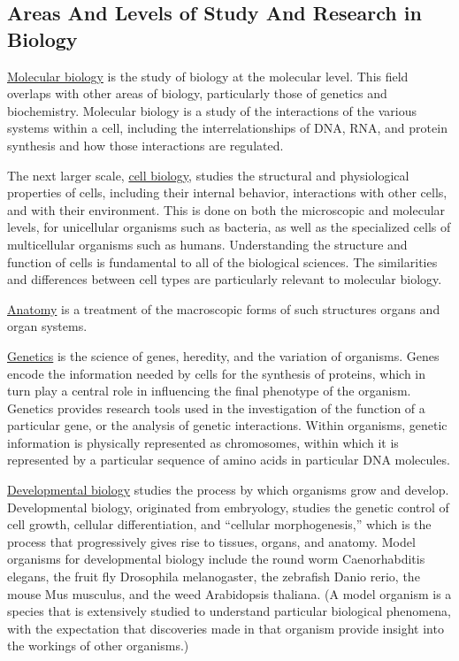 \documentclass[
]{article}
\begin{document}
\hypertarget{areas-and-levels-of-study-and-research-in-biology}{%
\subsection{Areas And Levels of Study And Research in
Biology}\label{areas-and-levels-of-study-and-research-in-biology}}

\href{https://en.wikipedia.org/wiki/Molecular_biology}{Molecular
biology} is the study of biology at the molecular level. This field
overlaps with other areas of biology, particularly those of genetics and
biochemistry. Molecular biology is a study of the interactions of the
various systems within a cell, including the interrelationships of DNA,
RNA, and protein synthesis and how those interactions are regulated.

The next larger scale,
\href{https://en.wikipedia.org/wiki/Cell_biology}{cell biology}, studies
the structural and physiological properties of cells, including their
internal behavior, interactions with other cells, and with their
environment. This is done on both the microscopic and molecular levels,
for unicellular organisms such as bacteria, as well as the specialized
cells of multicellular organisms such as humans. Understanding the
structure and function of cells is fundamental to all of the biological
sciences. The similarities and differences between cell types are
particularly relevant to molecular biology.

\href{https://en.wikipedia.org/wiki/Anatomy}{Anatomy} is a treatment of
the macroscopic forms of such structures organs and organ systems.

\href{https://en.wikipedia.org/wiki/Genetics}{Genetics} is the science
of genes, heredity, and the variation of organisms. Genes encode the
information needed by cells for the synthesis of proteins, which in turn
play a central role in influencing the final phenotype of the organism.
Genetics provides research tools used in the investigation of the
function of a particular gene, or the analysis of genetic interactions.
Within organisms, genetic information is physically represented as
chromosomes, within which it is represented by a particular sequence of
amino acids in particular DNA molecules.

\href{https://en.wikipedia.org/wiki/Developmental_biology}{Developmental
biology} studies the process by which organisms grow and develop.
Developmental biology, originated from embryology, studies the genetic
control of cell growth, cellular differentiation, and ``cellular
morphogenesis,'' which is the process that progressively gives rise to
tissues, organs, and anatomy. Model organisms for developmental biology
include the round worm Caenorhabditis elegans, the fruit fly Drosophila
melanogaster, the zebrafish Danio rerio, the mouse Mus musculus, and the
weed Arabidopsis thaliana. (A model organism is a species that is
extensively studied to understand particular biological phenomena, with
the expectation that discoveries made in that organism provide insight
into the workings of other organisms.)
\end{document}
